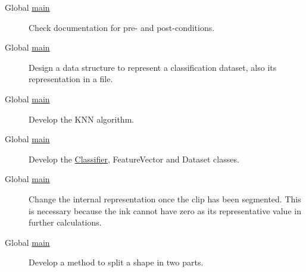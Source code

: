 \label{todo__todo000001}
\hypertarget{todo__todo000001}{}
 \begin{description}
\item[Global \hyperlink{main_8cpp_bf9e6b7e6f15df4b525a2e7705ba3089}{main} ]Check documentation for pre- and post-conditions.

\end{description}


\label{todo__todo000001}
\hypertarget{todo__todo000001}{}
 \begin{description}
\item[Global \hyperlink{main_8cpp_bf9e6b7e6f15df4b525a2e7705ba3089}{main} ]Design a data structure to represent a classification dataset, also its representation in a file.

\end{description}


\label{todo__todo000001}
\hypertarget{todo__todo000001}{}
 \begin{description}
\item[Global \hyperlink{main_8cpp_bf9e6b7e6f15df4b525a2e7705ba3089}{main} ]Develop the KNN algorithm.

\end{description}


\label{todo__todo000001}
\hypertarget{todo__todo000001}{}
 \begin{description}
\item[Global \hyperlink{main_8cpp_bf9e6b7e6f15df4b525a2e7705ba3089}{main} ]Develop the \hyperlink{class_classifier}{Classifier}, FeatureVector and Dataset classes.

\end{description}


\label{todo__todo000001}
\hypertarget{todo__todo000001}{}
 \begin{description}
\item[Global \hyperlink{main_8cpp_bf9e6b7e6f15df4b525a2e7705ba3089}{main} ]Change the internal representation once the clip has been segmented. This is necessary because the ink cannot have zero as its representative value in further calculations.

\end{description}


\label{todo__todo000001}
\hypertarget{todo__todo000001}{}
 \begin{description}
\item[Global \hyperlink{main_8cpp_bf9e6b7e6f15df4b525a2e7705ba3089}{main} ]Develop a method to split a shape in two parts.

\end{description}

